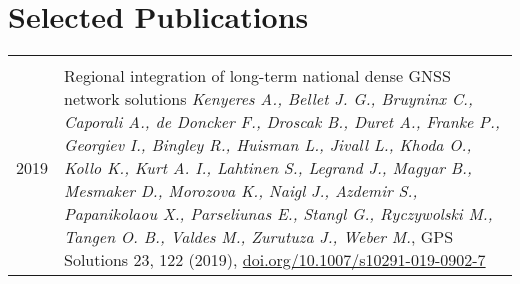 \documentclass[8pt]{extarticle} %
\begin{document}
\section*{Selected Publications}

\begin{longtable}{r|p{18cm}}
%
\multicolumn{2}{c}{} \\
  \textsc{2019}
%
  & Regional integration of long-term national dense GNSS network solutions
  \emph{Kenyeres A., Bellet J. G., Bruyninx C., Caporali A., de Doncker F., Droscak B., Duret A., Franke P., Georgiev I., Bingley R., Huisman L., Jivall L., Khoda O., Kollo K., Kurt A. I., Lahtinen S., Legrand J., Magyar B., Mesmaker D., Morozova K., Naigl J., Azdemir S., Papanikolaou X., Parseliunas E., Stangl G., Ryczywolski M., Tangen O. B., Valdes M., Zurutuza J., Weber M.}, GPS Solutions 23, 122 (2019), \href{https://doi.org/10.1007/s10291-019-0902-7}{doi.org/10.1007/s10291-019-0902-7}\\


\end{longtable}
\end{document}
